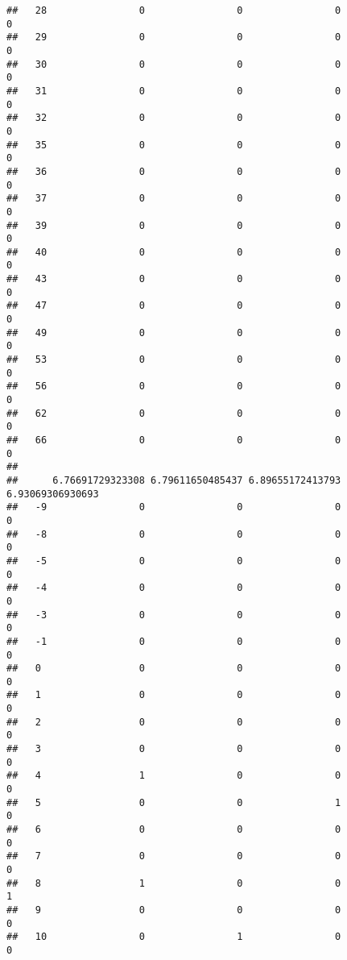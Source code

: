\documentclass[]{article}
\begin{document}
\begin{verbatim}
##   28                0                0                0                0
##   29                0                0                0                0
##   30                0                0                0                0
##   31                0                0                0                0
##   32                0                0                0                0
##   35                0                0                0                0
##   36                0                0                0                0
##   37                0                0                0                0
##   39                0                0                0                0
##   40                0                0                0                0
##   43                0                0                0                0
##   47                0                0                0                0
##   49                0                0                0                0
##   53                0                0                0                0
##   56                0                0                0                0
##   62                0                0                0                0
##   66                0                0                0                0
##     
##      6.76691729323308 6.79611650485437 6.89655172413793 6.93069306930693
##   -9                0                0                0                0
##   -8                0                0                0                0
##   -5                0                0                0                0
##   -4                0                0                0                0
##   -3                0                0                0                0
##   -1                0                0                0                0
##   0                 0                0                0                0
##   1                 0                0                0                0
##   2                 0                0                0                0
##   3                 0                0                0                0
##   4                 1                0                0                0
##   5                 0                0                1                0
##   6                 0                0                0                0
##   7                 0                0                0                0
##   8                 1                0                0                1
##   9                 0                0                0                0
##   10                0                1                0                0

\end{verbatim}
\end{document}
